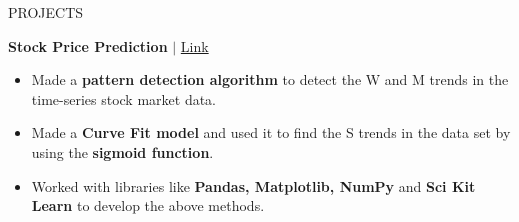 \documentclass{resume} %
\begin{document}

\begin{rSection}{\Large PROJECTS}
\vspace{-1.25em}
\item \textbf{Stock Price Prediction} \hspace{8px} $|$  \hspace{8px}   \href{https://github.com/Archit3115/Stock-Market-Analysis}{Link}
\begin{itemize}

\item Made a \textbf{pattern detection algorithm} to detect the W and M trends in the time-series stock market data.
\item Made a \textbf{Curve Fit model} and used it to find the S trends in the data set by using the \textbf{sigmoid function}.  
\item Worked with libraries like \textbf{Pandas, Matplotlib, NumPy} and \textbf{Sci Kit Learn} to develop the above methods.

\end{itemize}
\end{rSection} 

\end{document}
